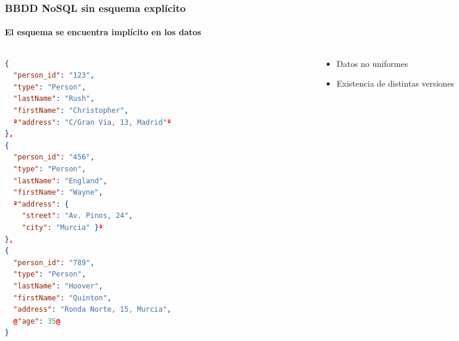 \documentclass[14pt]{beamer}
\begin{document}
\begin{frame}[fragile]
  \frametitle{BBDD NoSQL sin esquema explícito}
  \framesubtitle{El esquema se encuentra implícito en los datos}
  \begin{columns}
    \begin{column}{0.5\textwidth}
\begin{lstlisting}[language=json,basicstyle=\tiny\tt]
{
  "person_id": "123",
  "type": "Person",
  "lastName": "Rush",
  "firstName": "Christopher",
  º"address": "C/Gran Via, 13, Madrid"º
},
{
  "person_id": "456",
  "type": "Person",
  "lastName": "England",
  "firstName": "Wayne",
  º"address": {
    "street": "Av. Pinos, 24",
    "city": "Murcia" }º
},
{
  "person_id": "789",
  "type": "Person",
  "lastName": "Hoover",
  "firstName": "Quinton",
  "address": "Ronda Norte, 15, Murcia",
  @"age": 35@
}
      \end{lstlisting}
    \end{column}
    \begin{column}{0.05\textwidth}
      \begin{center}
        \usetikzlibrary{decorations.pathreplacing}
      \end{center}
    \end{column}
    \begin{column}{0.45\textwidth}
      \vspace{1cm}
      \usetikzlibrary{arrows}
      \hspace{-2cm}
\begin{small}
      \begin{itemize}
        \item Datos no uniformes
        \item Existencia de distintas versiones
      \end{itemize}
    \end{small}
  \end{column}
  \end{columns}
\end{frame}
\end{document}
